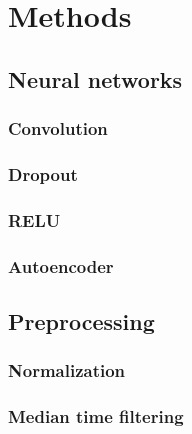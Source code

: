 \section{Methods}\label{section:methods}

\subsection{Neural networks} %
\label{sub:neural_networks}

\subsubsection{Convolution} %
\label{ssub:convolution}


\subsubsection{Dropout} %
\label{ssub:dropout}


\subsubsection{RELU} %
\label{ssub:relu}


\subsubsection{Autoencoder} %
\label{ssub:autoencoder}



\subsection{Preprocessing} %
\label{sub:preprocessing}

\subsubsection{Normalization} %
\label{ssub:normalization}


\subsubsection{Median time filtering} %
\label{ssub:median_time_filtering}


